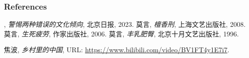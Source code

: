 %
%

\begin{frame} \frametitle{References}
\begin{thebibliography}{xx}\footnotesize

, {\em 警惕两种错误的文化倾向}, 北京日报, 2023.
 {\sc 莫言}, {\em 檀香刑}, 上海文艺出版社, 2008.
 {\sc 莫言}, {\em 生死疲劳}, 作家出版社, 2006.
 {\sc 莫言}, {\em 丰乳肥臀}, 北京十月文艺出版社, 1996.


 {\sc 焦波}, {\em 乡村里的中国}, URL: \textcolor{blue}{\url{https://www.bilibili.com/video/BV1FT4y1E7i7}}.



\end{thebibliography}
\end{frame}